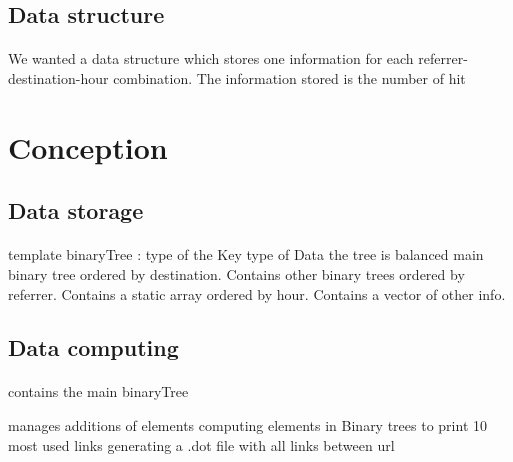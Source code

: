 \documentclass[a4paper, 12pts]{article}
\begin{document}
\subsection{Data structure}
\paragraph{}
 We wanted a data structure which stores one information for each referrer-destination-hour combination.
 The information stored is the number of hit
 
\newpage
 
\section{Conception}
\subsection{Data storage}
\paragraph{}
 template binaryTree :
    type of the Key
    type of Data
    the tree is balanced
main binary tree ordered by destination. Contains other binary trees ordered by referrer. Contains a static array ordered by hour. Contains a vector of other info.
\subsection{Data computing}
\paragraph{}
 contains the main binaryTree

 manages additions of elements
 computing elements in Binary trees to print 10 most used links
 generating a .dot file with all links between url
\end{document}
